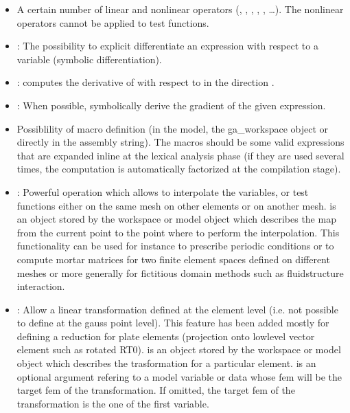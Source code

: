 \documentclass[a4paper,11pt,english]{sphinxmanual}
\begin{document}
\begin{itemize}
\item {} 
A certain number of linear and nonlinear operators (, , , , , …). The nonlinear operators cannot be applied to test functions.

\item {} 
: The possibility to explicit differentiate an expression with respect to a variable (symbolic differentiation).

\item {} 
: computes the derivative of  with respect to  in the direction .

\item {} 
: When possible, symbolically derive the gradient of the given expression.

\item {} 
Possiblility of macro definition (in the model, the ga\_workspace object or directly in the assembly string). The macros should be some valid expressions that are expanded inline at the lexical analysis phase (if they are used several times, the computation is automatically factorized at the compilation stage).

\item {} 
: Powerful operation which allows to interpolate the variables, or test functions either on the same mesh on other elements or on another mesh.  is an object stored by the workspace or model object which describes the map from the current point to the point where to perform the interpolation. This functionality can be used for instance to prescribe periodic conditions or to compute mortar matrices for two finite element spaces defined on different meshes or more generally for fictitious domain methods such as fluid\sphinxhyphen{}structure interaction.

\item {} 
: Allow a linear transformation defined at the element level (i.e. not possible to define at the gauss point level). This feature has been added mostly for defining a reduction for plate elements (projection onto low\sphinxhyphen{}level vector element such as rotated RT0).  is an object stored by the workspace or model object which describes the trasformation for a particular element.  is an optional argument refering to a model variable or data whose fem will be the target fem of the transformation. If omitted, the target fem of the transformation is the one of the first variable.


\end{itemize}
\end{document}
